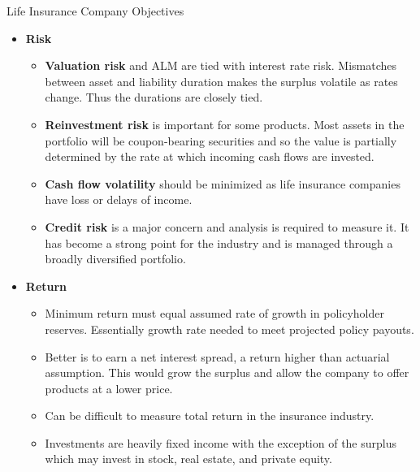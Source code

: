 \documentclass[../custom]{flashcards}
\begin{document}
\begin{flashcard}[\studyArea]{Life Insurance Company Objectives}
    \begin{itemize}[nosep]
        \item \textbf{Risk}
            \begin{itemize}[itemsep=.2\itemsep]
                \item \textbf{Valuation risk} and ALM are tied with interest rate risk. Mismatches between asset and liability duration makes the surplus volatile as rates change. Thus the durations are closely tied.
                \item \textbf{Reinvestment risk} is important for some products. Most assets in the portfolio will be coupon-bearing securities and so the value is partially determined by the rate at which incoming cash flows are invested.
                \item \textbf{Cash flow volatility} should be minimized as life insurance companies have loss or delays of income.
                \item \textbf{Credit risk} is a major concern and analysis is required to measure it. It has become a strong point for the industry and is managed through a broadly diversified portfolio.
            \end{itemize}
        \item \textbf{Return}
            \begin{itemize}[itemsep=.2\itemsep]
                \item Minimum return must equal assumed rate of growth in policyholder reserves. Essentially growth rate needed to meet projected policy payouts.
                \item Better is to earn a net interest spread, a return higher than actuarial assumption. This would grow the surplus and allow the company to offer products at a lower price.
                \item Can be difficult to measure total return in the insurance industry.
                \item Investments are heavily fixed income with the exception of the surplus which may invest in stock, real estate, and private equity.
            \end{itemize}
    \end{itemize}
\end{flashcard}

\renewcommand{\studyArea}{Management of Fixed Income Portfolios}
\end{document}
